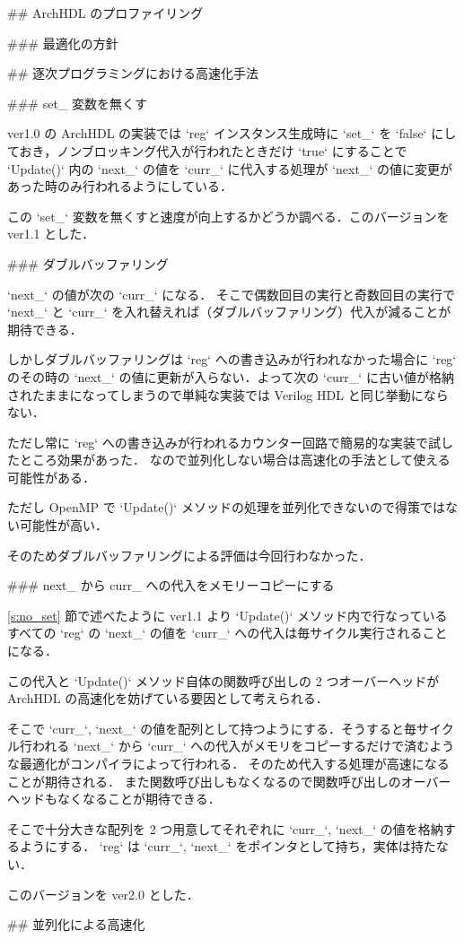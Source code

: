 ## ArchHDL のプロファイリング





### 最適化の方針







## 逐次プログラミングにおける高速化手法




### set_ 変数を無くす \label{s:no_set}

ver1.0 の ArchHDL の実装では `reg` インスタンス生成時に `set_` を `false`
にしておき，ノンブロッキング代入が行われたときだけ `true` にすることで
`Update()` 内の `next_` の値を `curr_`
に代入する処理が `next_` の値に変更があった時のみ行われるようにしている．

この `set_` 変数を無くすと速度が向上するかどうか調べる．このバージョンを
ver1.1 とした．




### ダブルバッファリング

`next_` の値が次の `curr_` になる．
そこで偶数回目の実行と奇数回目の実行で `next_` と `curr_`
を入れ替えれば（ダブルバッファリング）代入が減ることが期待できる．

しかしダブルバッファリングは `reg` への書き込みが行われなかった場合に
`reg` のその時の `next_` の値に更新が入らない．よって次の
`curr_` に古い値が格納されたままになってしまうので単純な実装では Verilog HDL と同じ挙動にならない．

ただし常に `reg` への書き込みが行われるカウンター回路で簡易的な実装で試したところ効果があった．
なので並列化しない場合は高速化の手法として使える可能性がある．

ただし OpenMP で `Update()` メソッドの処理を並列化できないので得策ではない可能性が高い．

そのためダブルバッファリングによる評価は今回行わなかった．


### next_ から curr_ への代入をメモリーコピーにする

\ref{s:no_set} 節で述べたように ver1.1 より
`Update()` メソッド内で行なっているすべての `reg` の `next_`
の値を `curr_` への代入は毎サイクル実行されることになる．

この代入と `Update()` メソッド自体の関数呼び出しの
2 つオーバーヘッドが ArchHDL の高速化を妨げている要因として考えられる．

そこで `curr_`, `next_`
の値を配列として持つようにする．そうすると毎サイクル行われる `next_` から `curr_`
への代入がメモリをコピーするだけで済むような最適化がコンパイラによって行われる．
そのため代入する処理が高速になることが期待される．
また関数呼び出しもなくなるので関数呼び出しのオーバーヘッドもなくなることが期待できる．

そこで十分大きな配列を 2 つ用意してそれぞれに `curr_`, `next_` の値を格納するようにする．
`reg` は `curr_`, `next_` をポインタとして持ち，実体は持たない．

このバージョンを ver2.0 とした．




## 並列化による高速化








